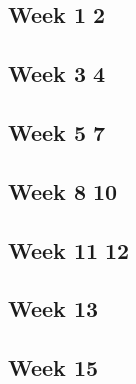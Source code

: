 \subsection{Week 1\,\textendash\,2}
\label{subsec:timeline-week1-2}

\subsection{Week 3\,\textendash\,4}
\label{subsec:timeline-week3-4}

\subsection{Week 5\,\textendash\,7}
\label{subsec:timeline-week5-7}

\subsection{Week 8\,\textendash\,10}
\label{subsec:timeline-week8-10}

\subsection{Week 11\,\textendash\,12}
\label{subsec:timeline-week11-12}

\subsection{Week 13\,}
\label{subsec:timeline-week13-14}

\subsection{Week 15}
\label{subsec:timeline-week15}
